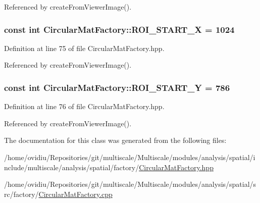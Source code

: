 \-Referenced by create\-From\-Viewer\-Image().

\hypertarget{classmultiscale_1_1analysis_1_1CircularMatFactory_a0e2da07df4736b0ec21567721ae94af5}{
\subsubsection[{\-R\-O\-I\-\_\-\-S\-T\-A\-R\-T\-\_\-\-X}]{\setlength{\rightskip}{0pt plus 5cm}const int {\bf \-Circular\-Mat\-Factory\-::\-R\-O\-I\-\_\-\-S\-T\-A\-R\-T\-\_\-\-X} = 1024}}\label{classmultiscale_1_1analysis_1_1CircularMatFactory_a0e2da07df4736b0ec21567721ae94af5}


\-Definition at line 75 of file \-Circular\-Mat\-Factory.\-hpp.



\-Referenced by create\-From\-Viewer\-Image().

\hypertarget{classmultiscale_1_1analysis_1_1CircularMatFactory_a94368fde6348afd7074491c2cf333910}{
\subsubsection[{\-R\-O\-I\-\_\-\-S\-T\-A\-R\-T\-\_\-\-Y}]{\setlength{\rightskip}{0pt plus 5cm}const int {\bf \-Circular\-Mat\-Factory\-::\-R\-O\-I\-\_\-\-S\-T\-A\-R\-T\-\_\-\-Y} = 786}}\label{classmultiscale_1_1analysis_1_1CircularMatFactory_a94368fde6348afd7074491c2cf333910}


\-Definition at line 76 of file \-Circular\-Mat\-Factory.\-hpp.



\-Referenced by create\-From\-Viewer\-Image().



\-The documentation for this class was generated from the following files\-:\begin{DoxyCompactItemize}
\item 
/home/ovidiu/\-Repositories/git/multiscale/\-Multiscale/modules/analysis/spatial/include/multiscale/analysis/spatial/factory/\hyperlink{CircularMatFactory_8hpp}{\-Circular\-Mat\-Factory.\-hpp}\item 
/home/ovidiu/\-Repositories/git/multiscale/\-Multiscale/modules/analysis/spatial/src/factory/\hyperlink{CircularMatFactory_8cpp}{\-Circular\-Mat\-Factory.\-cpp}\end{DoxyCompactItemize}
